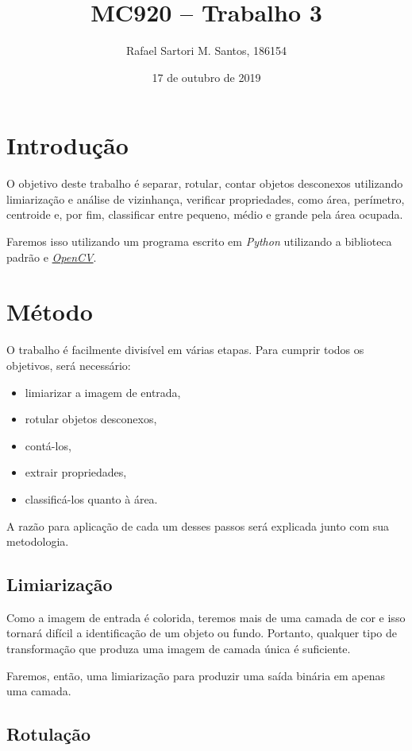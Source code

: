 \documentclass[brazilian,a4paper,twocolumn]{article}
\title{MC920 -- Trabalho 3}
\author{Rafael Sartori M. Santos, 186154}
\date{17 de outubro de 2019}
\begin{document}
\maketitle


\section{Introdução}

    O objetivo deste trabalho é separar, rotular, contar objetos desconexos utilizando limiarização e análise de vizinhança, verificar propriedades, como área, perímetro, centroide e, por fim, classificar entre pequeno, médio e grande pela área ocupada.

    Faremos isso utilizando um programa escrito em \emph{Python} utilizando a biblioteca padrão e \href{https://opencv.org/}{\emph{OpenCV}}.


\section{Método}

    O trabalho é facilmente divisível em várias etapas. Para cumprir todos os objetivos, será necessário:
    \begin{itemize}
        \item limiarizar a imagem de entrada,
        \item rotular objetos desconexos,
        \item contá-los,
        \item extrair propriedades,
        \item classificá-los quanto à área.
    \end{itemize}

    A razão para aplicação de cada um desses passos será explicada junto com sua metodologia.

    \subsection{Limiarização}

        Como a imagem de entrada é colorida, teremos mais de uma camada de cor e isso tornará difícil a identificação de um objeto ou fundo. Portanto, qualquer tipo de transformação que produza uma imagem de camada única é suficiente.

        Faremos, então, uma limiarização para produzir uma saída binária em apenas uma camada.

    \subsection{Rotulação}
\end{document}

